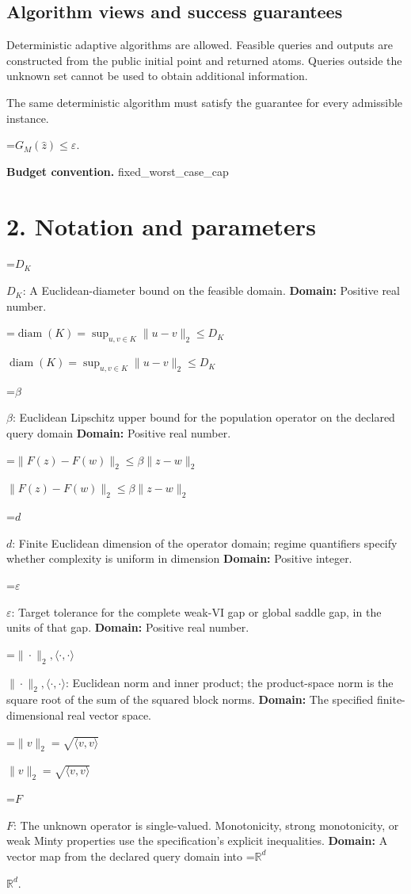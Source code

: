 \documentclass[10pt,a4paper]{article}
\newcommand{\AtlasMath}[1]{\par\begingroup\centering\setbox0=\hbox{$\displaystyle #1$}\ifdim\wd0>1.4\linewidth\typeout{ATLAS WIDE FORMULA: \the\wd0}\fi\ifdim\wd0>\linewidth\resizebox{\linewidth}{!}{\box0}\else\box0\fi\par\endgroup}
\newcommand{\AtlasInlineMath}[1]{\begingroup\setbox0=\hbox{$#1$}\ifdim\wd0>.4\linewidth\endgroup\AtlasMath{#1}\else\endgroup$#1$\fi}
\begin{document}
\subsection{Algorithm views and success guarantees}
Deterministic adaptive algorithms are allowed. Feasible queries and outputs are constructed from the public initial point and returned atoms. Queries outside the unknown set cannot be used to obtain additional information.

The same deterministic algorithm must satisfy the guarantee for every admissible instance.


\AtlasMath{G_M(\widehat{z})\le\varepsilon.}


\textbf{Budget convention.} fixed\_\allowbreak{}worst\_\allowbreak{}case\_\allowbreak{}cap

\section{2. Notation and parameters}
\AtlasInlineMath{D_K}: A Euclidean-diameter bound on the feasible domain. \textbf{Domain:} Positive real number.

\AtlasInlineMath{\operatorname{diam}(K)=\sup_{u,v\in K}\|u-v\|_2\le D_K}

\AtlasInlineMath{\beta}: Euclidean Lipschitz upper bound for the population operator on the declared query domain \textbf{Domain:} Positive real number.

\AtlasInlineMath{\|F(z)-F(w)\|_2\le\beta\|z-w\|_2}

\AtlasInlineMath{d}: Finite Euclidean dimension of the operator domain; regime quantifiers specify whether complexity is uniform in dimension \textbf{Domain:} Positive integer.

\AtlasInlineMath{\varepsilon}: Target tolerance for the complete weak-VI gap or global saddle gap, in the units of that gap. \textbf{Domain:} Positive real number.

\AtlasInlineMath{\|\cdot\|_2,\langle\cdot,\cdot\rangle}: Euclidean norm and inner product; the product-space norm is the square root of the sum of the squared block norms. \textbf{Domain:} The specified finite-dimensional real vector space.

\AtlasInlineMath{\|v\|_2=\sqrt{\langle v,v\rangle}}

\AtlasInlineMath{F}: The unknown operator is single-valued. Monotonicity, strong monotonicity, or weak Minty properties use the specification’s explicit inequalities. \textbf{Domain:} A vector map from the declared query domain into \AtlasInlineMath{\mathbb R^d}.
\end{document}
